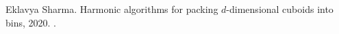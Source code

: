 
\frontmatter







\let\oldbibname\bibname
\renewcommand{\bibname}{Publications based on this Thesis}

\begin{thebibliography}{1}

\begin{comment}
\bibitem{manual-aco-gvbp}
Sreenivas Karnati, Arindam Khan, and Eklavya Sharma.
\newblock Geometry meets vectors: Approximation algorithms for multidimensional
  packing.
\newblock Manuscript, December 2020.

\bibitem{manual-eku-pst}
Eklavya Sharma.
\newblock An approximation algorithm for covering linear programs and its
  application to bin-packing, 2020.
\newblock \href {http://arxiv.org/abs/2011.11268} {\path{arXiv:2011.11268}}.
\end{comment}

Eklavya Sharma.
\newblock Harmonic algorithms for packing {$d$-dimensional} cuboids into bins,
  2020.
\newblock \href {http://arxiv.org/abs/2011.10963} {}.

\end{thebibliography}

\renewcommand{\bibname}{\oldbibname}
